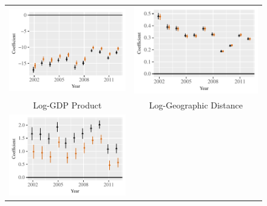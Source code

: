 \documentclass[12pt]{article}
\begin{document}
\begin{figure}[htp]
\begin{tabular}{c@{\hskip -.4cm}c}
\includegraphics[height=.22\textheight, clip=true, trim=0cm .5cm 0cm .1cm]{draft_figures/rl_plots/Nonzero.pdf} &
\includegraphics[height=.22\textheight, clip=true, trim=.5cm .5cm 0cm .1cm]{draft_figures/rl_plots/LDV.pdf}   \\
Log-GDP Product &
Log-Geographic Distance\\
\includegraphics[height=.22\textheight, clip=true, trim=0cm .5cm 0cm .1cm]{draft_figures/rl_plots/Mass.pdf}    &

\end{tabular}
\end{figure}
\end{document}
